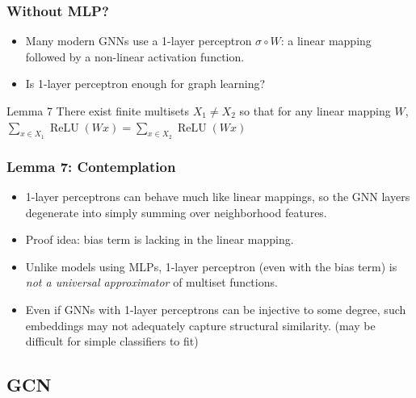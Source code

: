 \documentclass{beamer}
\DeclareMathOperator{\relu}{ReLU}
\begin{document}
\begin{frame}
\frametitle{Without MLP?}

\begin{itemize}
	\item Many modern GNNs use a 1-layer perceptron $\sigma \circ W$: a linear mapping followed by a non-linear activation function. \pause
	
	\item Is 1-layer perceptron enough for graph learning? \pause

\end{itemize}

\begin{block}{Lemma 7}
There exist finite multisets $X_1 \not= X_2$ so that for any linear mapping $W$, $\sum_{x \in X_1} \relu(Wx) = \sum_{x \in X_2} \relu(Wx)$
\end{block}

\end{frame}

\begin{frame}
\frametitle{Lemma 7: Contemplation}

\begin{itemize}
	\item 1-layer perceptrons can behave much like linear mappings, so the GNN layers degenerate into simply summing over neighborhood features. \pause
	
	\item Proof idea: bias term is lacking in the linear mapping.
	
	\item Unlike models using MLPs, 1-layer perceptron (even with the bias term) is {\it not a universal approximator} of multiset functions. \pause
	
	\item Even if GNNs with 1-layer perceptrons can be injective to some degree, such embeddings may not adequately capture structural similarity. (may be difficult for simple classifiers to fit)

\end{itemize}

\end{frame}


\subsection{GCN}
\end{document}
